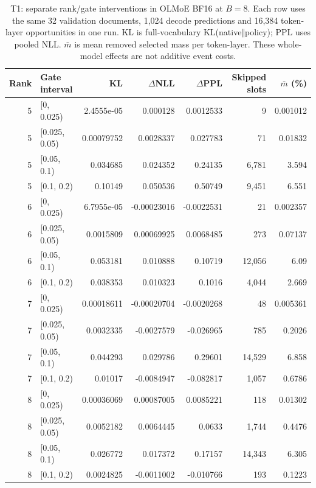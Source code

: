 \documentclass[10pt,twocolumn]{article}
\begin{document}
\begin{table}[t]\centering\footnotesize
\caption{T1: separate rank/gate interventions in OLMoE BF16 at $B=8$. Each row uses the same 32 validation documents, 1,024 decode predictions and 16,384 token-layer opportunities in one run. KL is full-vocabulary KL(native$\Vert$policy); PPL uses pooled NLL. $\bar m$ is mean removed selected mass per token-layer. These whole-model effects are not additive event costs.}\label{tab:drop}
\begin{tabular}{r l r r r r r}\toprule
Rank & Gate interval & KL & $\Delta$NLL & $\Delta$PPL & Skipped slots & $\bar m$ (\%)\\\midrule
5 & [0, 0.025) & 2.4555e-05 & 0.000128 & 0.0012533 & 9 & 0.001012 \\
5 & [0.025, 0.05) & 0.00079752 & 0.0028337 & 0.027783 & 71 & 0.01832 \\
5 & [0.05, 0.1) & 0.034685 & 0.024352 & 0.24135 & 6,781 & 3.594 \\
5 & [0.1, 0.2) & 0.10149 & 0.050536 & 0.50749 & 9,451 & 6.551 \\
6 & [0, 0.025) & 6.7955e-05 & -0.00023016 & -0.0022531 & 21 & 0.002357 \\
6 & [0.025, 0.05) & 0.0015809 & 0.00069925 & 0.0068485 & 273 & 0.07137 \\
6 & [0.05, 0.1) & 0.053181 & 0.010888 & 0.10719 & 12,056 & 6.09 \\
6 & [0.1, 0.2) & 0.038353 & 0.010323 & 0.1016 & 4,044 & 2.669 \\
7 & [0, 0.025) & 0.00018611 & -0.00020704 & -0.0020268 & 48 & 0.005361 \\
7 & [0.025, 0.05) & 0.0032335 & -0.0027579 & -0.026965 & 785 & 0.2026 \\
7 & [0.05, 0.1) & 0.044293 & 0.029786 & 0.29601 & 14,529 & 6.858 \\
7 & [0.1, 0.2) & 0.01017 & -0.0084947 & -0.082817 & 1,057 & 0.6786 \\
8 & [0, 0.025) & 0.00036069 & 0.00087005 & 0.0085221 & 118 & 0.01302 \\
8 & [0.025, 0.05) & 0.0052182 & 0.0064445 & 0.0633 & 1,744 & 0.4476 \\
8 & [0.05, 0.1) & 0.026772 & 0.017372 & 0.17157 & 14,343 & 6.305 \\
8 & [0.1, 0.2) & 0.0024825 & -0.0011002 & -0.010766 & 193 & 0.1223 \\
\bottomrule\end{tabular}\end{table}
\end{document}
